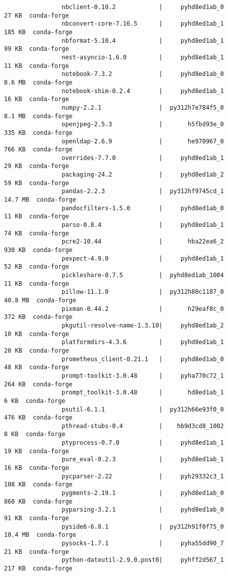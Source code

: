 \documentclass{article}
\begin{document}
\begin{itemize}
\begin{itemize}
\begin{itemize}
\begin{verbatim}
				nbclient-0.10.2            |     pyhd8ed1ab_0          27 KB  conda-forge
				nbconvert-core-7.16.5      |     pyhd8ed1ab_1         185 KB  conda-forge
				nbformat-5.10.4            |     pyhd8ed1ab_1          99 KB  conda-forge
				nest-asyncio-1.6.0         |     pyhd8ed1ab_1          11 KB  conda-forge
				notebook-7.3.2             |     pyhd8ed1ab_0         8.6 MB  conda-forge
				notebook-shim-0.2.4        |     pyhd8ed1ab_1          16 KB  conda-forge
				numpy-2.2.1                |  py312h7e784f5_0         8.1 MB  conda-forge
				openjpeg-2.5.3             |       h5fbd93e_0         335 KB  conda-forge
				openldap-2.6.9             |       he970967_0         766 KB  conda-forge
				overrides-7.7.0            |     pyhd8ed1ab_1          29 KB  conda-forge
				packaging-24.2             |     pyhd8ed1ab_2          59 KB  conda-forge
				pandas-2.2.3               |  py312hf9745cd_1        14.7 MB  conda-forge
				pandocfilters-1.5.0        |     pyhd8ed1ab_0          11 KB  conda-forge
				parso-0.8.4                |     pyhd8ed1ab_1          74 KB  conda-forge
				pcre2-10.44                |       hba22ea6_2         930 KB  conda-forge
				pexpect-4.9.0              |     pyhd8ed1ab_1          52 KB  conda-forge
				pickleshare-0.7.5          |  pyhd8ed1ab_1004          11 KB  conda-forge
				pillow-11.1.0              |  py312h80c1187_0        40.8 MB  conda-forge
				pixman-0.44.2              |       h29eaf8c_0         372 KB  conda-forge
				pkgutil-resolve-name-1.3.10|     pyhd8ed1ab_2          10 KB  conda-forge
				platformdirs-4.3.6         |     pyhd8ed1ab_1          20 KB  conda-forge
				prometheus_client-0.21.1   |     pyhd8ed1ab_0          48 KB  conda-forge
				prompt-toolkit-3.0.48      |     pyha770c72_1         264 KB  conda-forge
				prompt_toolkit-3.0.48      |       hd8ed1ab_1           6 KB  conda-forge
				psutil-6.1.1               |  py312h66e93f0_0         476 KB  conda-forge
				pthread-stubs-0.4          |    hb9d3cd8_1002           8 KB  conda-forge
				ptyprocess-0.7.0           |     pyhd8ed1ab_1          19 KB  conda-forge
				pure_eval-0.2.3            |     pyhd8ed1ab_1          16 KB  conda-forge
				pycparser-2.22             |     pyh29332c3_1         108 KB  conda-forge
				pygments-2.19.1            |     pyhd8ed1ab_0         868 KB  conda-forge
				pyparsing-3.2.1            |     pyhd8ed1ab_0          91 KB  conda-forge
				pyside6-6.8.1              |  py312h91f0f75_0        10.4 MB  conda-forge
				pysocks-1.7.1              |     pyha55dd90_7          21 KB  conda-forge
				python-dateutil-2.9.0.post0|     pyhff2d567_1         217 KB  conda-forge

\end{verbatim}
\end{itemize}
\end{itemize}
\end{itemize}
\end{document}
